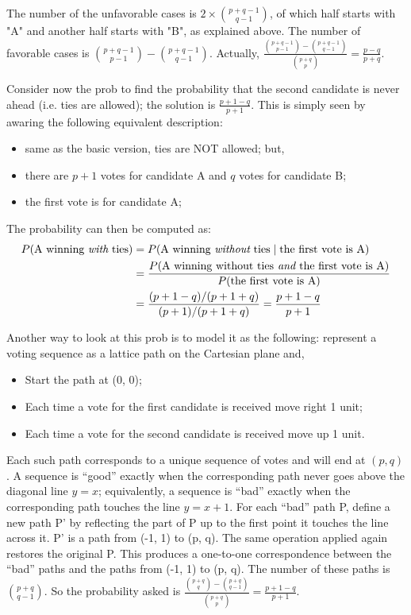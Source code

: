 The number of the unfavorable cases is $2 \times {p+q-1 \choose q-1}$, of which half starts with "A" and another half starts with "B", as explained above. The number of favorable cases is ${p+q-1 \choose p-1} - {p+q-1 \choose q-1}$. Actually, $\frac{{p+q-1 \choose p-1} - {p+q-1 \choose q-1}}{{p+q \choose p}} = \frac{p-q}{p+q}$.

Consider now the prob to find the probability that the second candidate is never ahead (i.e. ties are allowed); the solution is $\frac{p+1-q}{p+1}$. This is simply seen by awaring the following equivalent description:
\begin{itemize}
	\item same as the basic version, ties are NOT allowed; but,
	\item there are $p+1$ votes for candidate A and $q$ votes for candidate B;
	\item the first vote is for candidate A;
\end{itemize}
The probability can then be computed as:
\begin{equation*}
\begin{split}
	P(\mbox{A winning \mbox{\em{with}} ties}) & = P(\mbox{A winning \mbox{\em{without}} ties} \mid \mbox{the first vote is A})\\
	& =  \frac{P(\mbox{A winning without ties} \mbox{\em{ and }} \mbox{the first vote is A})}{P(\mbox{the first vote is A})}\\
	& = \frac{(p+1-q)/(p+1+q)}{(p+1)/(p+1+q)} = \frac{p+1-q}{p+1}
\end{split}
 \end{equation*}

 Another way to look at this prob is to model it as the following: represent a voting sequence as a lattice path on the Cartesian plane and,
\begin{itemize}
	\item Start the path at (0, 0);
	\item Each time a vote for the first candidate is received move right 1 unit;
	\item Each time a vote for the second candidate is received move up 1 unit.
\end{itemize}
Each such path corresponds to a unique sequence of votes and will end at $(p, q)$. A sequence is ``good'' exactly when the corresponding path never goes above the diagonal line $y = x$; equivalently, a sequence is ``bad'' exactly when the corresponding path touches the line $y = x + 1$. For each ``bad'' path P, define a new path P' by reflecting the part of P up to the first point it touches the line across it. P' is a path from (-1, 1) to (p, q). The same operation applied again restores the original P. This produces a one-to-one correspondence between the ``bad'' paths and the paths from (-1, 1) to (p, q). The number of these paths is $p+q \choose q-1$. So the probability asked is $\frac{{p+q \choose q} - {p+q \choose q-1}}{{p+q \choose p}} = \frac{p+1-q}{p+1}$.

